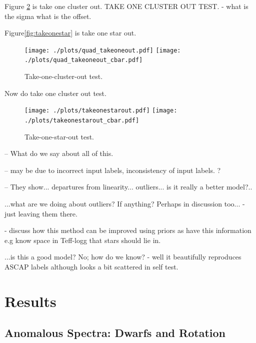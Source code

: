 \documentclass[12pt, preprint]{aastex}
\begin{document}
Figure \ref{fig:takeoneout} is take one cluster out. 
TAKE ONE CLUSTER OUT TEST. 
- what is the sigma
what is the offset. 

Figure\ref{fig:takeonestar} is take one star out. 

\begin{figure}[h!]
\centering
  \texttt{[image: ./plots/quad\_takeoneout.pdf]}
    \texttt{[image: ./plots/quad\_takeoneout\_cbar.pdf]}
\caption{Take-one-cluster-out test.}
\label{fig:takeoneout}
\end{figure}

Now do take one cluster out test. 

\begin{figure}[h!]
\centering
  \texttt{[image: ./plots/takeonestarout.pdf]}
    \texttt{[image: ./plots/takeonestarout\_cbar.pdf]}
\caption{Take-one-star-out test.}
\label{fig:takeoneout}
\end{figure}

-- What do we say about all of this. 

-- may be due to incorrect input labels, inconsistency of input labels. ?

-- They show... departures from linearity... outliers... is it really a better model?..

...what are we doing about outliers?  If anything?  Perhaps in discussion too... - just leaving them there. 

- discuss how this method can be improved using priors as have this information e.g know space in Teff-logg that stars should lie in. 

...is this a good model?  No; how do we know? - well it beautifully reproduces ASCAP labels although looks a bit scattered in self test.







\section{Results}

\subsection{Anomalous Spectra: Dwarfs and Rotation}
\end{document}
